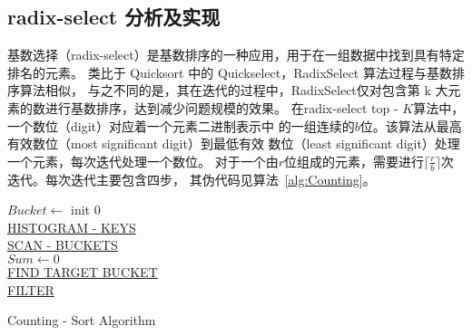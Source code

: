 \subsection{radix-select 分析及实现}
基数选择（radix-select）是基数排序的一种应用，用于在一组数据中找到具有特定排名的元素。
类比于 Quicksort 中的 Quickselect，RadixSelect 算法过程与基数排序算法相似，
与之不同的是，其在迭代的过程中，RadixSelect仅对包含第 k 大元素的数进行基数排序，达到减少问题规模的效果。
在radix-select top - \(K\)算法中，一个数位（digit）对应着一个元素二进制表示中
的一组连续的\(b\)位。该算法从最高有效数位（most significant digit）到最低有效
数位（least significant digit）处理一个元素，每次迭代处理一个数位。
对于一个由\(r\)位组成的元素，需要进行\(\lceil\frac{r}{b}\rceil\)次迭代。每次迭代主要包含四步，
其伪代码见算法~\ref{alg:Counting}。

\begin{algorithm}
    \SetAlgoLined
    $Bucket \leftarrow$ init $0$ \\ 
    \underline{HISTOGRAM - KEYS}\\
    \underline{SCAN - BUCKETS}\\
    $Sum \leftarrow 0$\\
    \underline{FIND TARGET BUCKET}\\
    \underline{FILTER}\\
    \caption{Counting - Sort Algorithm}
    \label{alg:Counting}
  \end{algorithm}
  

